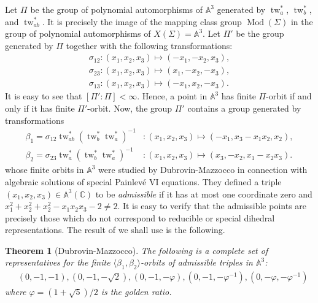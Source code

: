 \documentclass[reqno]{amsart}
\theoremstyle{plain}
\newtheorem{theorem}{Theorem}[section]
\theoremstyle{definition}
\theoremstyle{remark}
\newcommand{\A}{{\mathbb{A}}}
\newcommand{\C}{{\mathbb{C}}}
\DeclareMathOperator{\Mod}{Mod}
\DeclareMathOperator{\tw}{tw}
\begin{document}
Let $\Pi$ be the group of polynomial automorphisms of $\A^3$ generated by $\tw_{a}^*$, $\tw_{b}^*$, and $\tw_{ab}^*$. It is precisely the image of the mapping class group $\Mod(\Sigma)$ in the group of polynomial automorphisms of $X(\Sigma)=\A^3$. Let $\Pi'$ be the group generated by $\Pi$ together with the following transformations:
\begin{align*}
\sigma_{12}:(x_1,x_2,x_3)\mapsto(-x_1,-x_2,x_3),\\
\sigma_{23}:(x_1,x_2,x_3)\mapsto(x_1,-x_2,-x_3),\\
\sigma_{13}:(x_1,x_2,x_3)\mapsto(-x_1,x_2,-x_3).
\end{align*}
It is easy to see that $[\Pi':\Pi]<\infty$. Hence, a point in $\A^3$ has finite $\Pi$-orbit if and only if it has finite $\Pi'$-orbit. Now, the group $\Pi'$ contains a group generated by transformations
\begin{align*}
\beta_1=\sigma_{12}\tw_{ab}^*(\tw_{b}^*\tw_{a}^*)^{-1}&:(x_1,x_2,x_3)\mapsto(-x_1,x_3-x_1x_2,x_2),\\
\beta_2=\sigma_{23}\tw_{a}^*(\tw_{b}^*\tw_{a}^*)^{-1}&:(x_1,x_2,x_3)\mapsto(x_3,-x_2,x_1-x_2x_3).
\end{align*}
whose finite orbits in $\A^3$ were studied by Dubrovin-Mazzocco \cite[Theorem 1.6]{dm} in connection with algebraic solutions of special Painlev\'e VI equations. They defined a triple $(x_1,x_2,x_3)\in\A^3(\C)$ to be \emph{admissible} if it has at most one coordinate zero and $x_1^2+x_2^2+x_2^2-x_1x_2x_3-2\neq2$. It is easy to verify that the admissible points are precisely those which do not correspond to reducible or special dihedral representations. The result of \cite{dm} we shall use is the following.

\begin{theorem}[Dubrovin-Mazzocco]
\label{dubm}
The following is a complete set of representatives for the finite $\langle\beta_1,\beta_2\rangle$-orbits of admissible triples in $\A^3$:
\begin{align*}
&(0,-1,-1), (0,-1,-\sqrt{2}),(0,-1,-\varphi),(0,-1,-\varphi^{-1}),(0,-\varphi,-\varphi^{-1})
\end{align*}
where $\varphi=(1+\sqrt{5})/2$ is the golden ratio.
\end{theorem}
\end{document}
